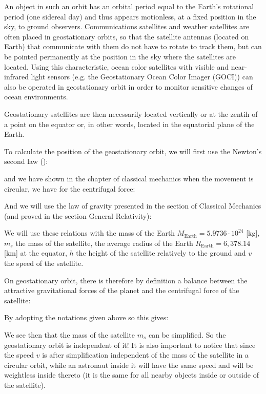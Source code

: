 	An object in such an orbit has an orbital period equal to the Earth's rotational period (one sidereal day) and thus appears motionless, at a fixed position in the sky, to ground observers. Communications satellites and weather satellites are often placed in geostationary orbits, so that the satellite antennas (located on Earth) that communicate with them do not have to rotate to track them, but can be pointed permanently at the position in the sky where the satellites are located. Using this characteristic, ocean color satellites with visible and near-infrared light sensors (e.g. the Geostationary Ocean Color Imager (GOCI)) can also be operated in geostationary orbit in order to monitor sensitive changes of ocean environments.
	
	Geostationary satellites are then necessarily located vertically or at the zentih of a point on the equator or, in other words, located in the equatorial plane of the Earth.
	
	To calculate the position of the geostationary orbit, we will first use the Newton's second law ():
	
	and we have shown in the chapter of classical mechanics when the movement is circular, we have for the centrifugal force:
	
	And we will use the law of gravity presented in the section of Classical Mechanics (and proved in the section General Relativity):
	
	We will use these relations with the mass of the Earth $M_\text{Earth}=5.9736\cdot 10^{24}$ [kg], $m_s$ the mass of the satellite, the average radius of the Earth $R_\text{Earth}=6,378.14$ [km] at the equator, $h$ the height of the satellite relatively to the ground and $v$ the speed of the satellite.
	
	On geostationary orbit, there is therefore by definition a balance between the attractive gravitational forces of the planet and the centrifugal force of the satellite:
	
	By adopting the notations given above so this gives:
	
	We see then that the mass of the satellite $m_s$ can be simplified. So the geostationary orbit is independent of it! It is also important to notice that since the speed $v$ is after simplification independent of the mass of the satellite in a circular orbit, while an astronaut inside it will have the same speed and will be weightless inside thereto (it is the same for all nearby objects inside or outside of the satellite).
	
